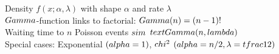 \documentclass[preview]{standalone}
\begin{document}
Density $f(x;\alpha,\lambda)$ with shape $\alpha$ and rate $\lambda$\\$\\Gamma$-function links to factorial: $\\Gamma(n)=(n-1)!$\\Waiting time to $n$ Poisson events $\\sim$ $\\text{Gamma}(n,\\lambda)$\\Special cases: Exponential $(\\alpha=1)$, $\\chi^2$ $(\\alpha=n/2,\\ \lambda=\\tfrac12)$\\
\end{document}
